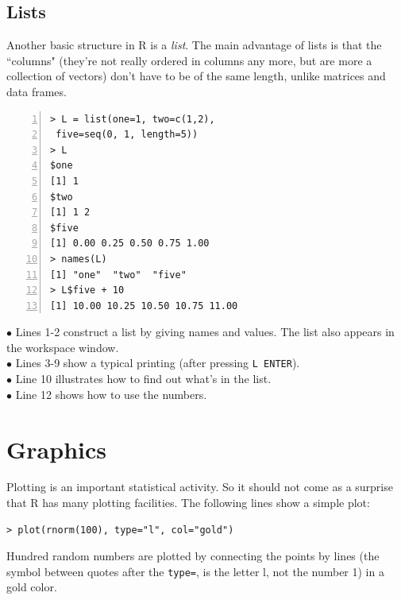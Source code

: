 \documentclass[a4paper,11pt,twocolumn,tablecaptionabove]{scrartcl}
\begin{document}
\subsection{Lists}

Another basic structure in R is a \emph{list}. The main advantage of lists is that the ``columns" (they're not really ordered in columns any more, but are more a collection of vectors) don't have to be of the same length, unlike matrices and data frames. 

\begin{Verbatim}[frame=single,numbers=left,gobble=0, xleftmargin=0.35cm, numbersep=0.1cm]
> L = list(one=1, two=c(1,2), 
 five=seq(0, 1, length=5))
> L
$one
[1] 1
$two
[1] 1 2
$five
[1] 0.00 0.25 0.50 0.75 1.00
> names(L)
[1] "one"  "two"  "five"
> L$five + 10
[1] 10.00 10.25 10.50 10.75 11.00
\end{Verbatim}

\noindent $\bullet$ Lines 1-2 construct a list by giving names and values. The list also appears in the workspace window.\\
\noindent $\bullet$ Lines 3-9 show a typical printing (after pressing \texttt{L ENTER}). \\
\noindent $\bullet$ Line 10 illustrates how to find out what's in the list.\\
\noindent $\bullet$ Line 12 shows how to use the numbers. \\


\section{Graphics}
\label{sec:some-plotting}

Plotting is an important statistical activity. So it should not come as a
surprise that R has many plotting facilities. 
The following lines show a simple plot:
\begin{Verbatim}[frame=single,gobble=0]
> plot(rnorm(100), type="l", col="gold")
\end{Verbatim}

\noindent Hundred random numbers are plotted by connecting the points by lines (the
symbol between quotes after the \texttt{type=}, is the letter l, not the
number 1) in a gold color.
\end{document}
